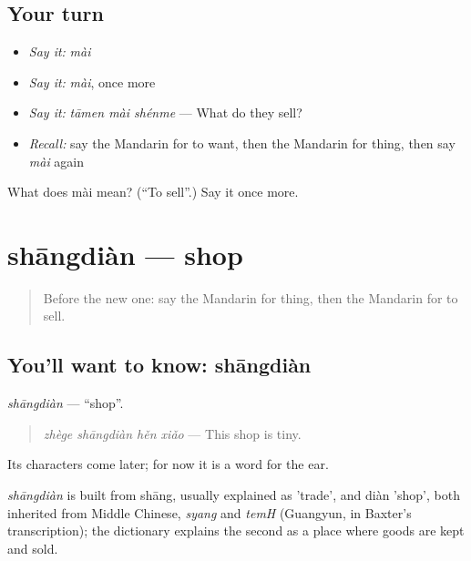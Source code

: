 \subsection*{Your turn}
\begin{itemize}
\raggedright
  \item \emph{Say it:} \emph{mài}
  \item \emph{Say it:} \emph{mài}, once more
  \item \emph{Say it:} \emph{tāmen mài shénme} — What do they sell?
  \item \emph{Recall:} say the Mandarin for to want, then the Mandarin for thing, then say \emph{mài} again
\end{itemize}

\begin{tcolorbox}[breakable,colback=teal!4,colframe=teal!35!black,title={Before you move on}]
What does mài mean? (\textquotedblleft{}To sell\textquotedblright{}.) Say it once more.
\end{tcolorbox}
\section[shāngdiàn]{shāngdiàn — shop}

\label{lesson:ZH-C42-shangdian}



\begin{quote}
Before the new one: say the Mandarin for thing, then the Mandarin for to sell.
\end{quote}

\subsection*{You'll want to know: shāngdiàn}
\emph{shāngdiàn} — \textquotedblleft{}shop\textquotedblright{}.

\begin{quote}
\emph{zhège shāngdiàn hěn xiǎo} — This shop is tiny.
\end{quote}

Its characters come later; for now it is a word for the ear.

\begin{cousinweb}
\emph{shāngdiàn} is built from shāng, usually explained as 'trade', and diàn 'shop', both inherited from Middle Chinese, \emph{syang} and \emph{temH} (Guangyun, in Baxter's transcription); the dictionary explains the second as a place where goods are kept and sold.
\end{cousinweb}


